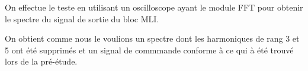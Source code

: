\documentclass[11pt, openright]{book}
\begin{document}
On effectue le teste en utilisant un oscilloscope ayant le module FFT pour obtenir le spectre du signal de sortie du bloc MLI.
\begin{figure}[ht!]
	\begin{floatrow}


	\end{floatrow}
\end{figure}



On obtient comme nous le voulions un spectre dont les harmoniques de rang 3 et 5 ont été supprimés et un signal de commmande conforme à ce qui à été trouvé lors de la pré-étude.
\end{document}
